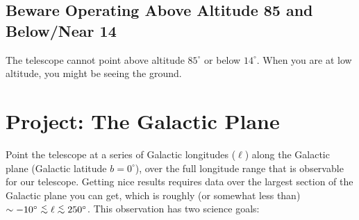 \documentclass[psfig,preprint]{aastex}
\def\simlt{\lower.5ex\hbox{$\; \buildrel < \over \sim \;$}}
\begin{document}
\subsection{Beware Operating Above Altitude 85 and Below/Near 14}

\noindent
The telescope cannot point above altitude $85^\circ$ or 
below $14^\circ$. When you are at low altitude, you might be
seeing the ground.

\section{Project: The Galactic Plane } 
\label{galacticplane}

\noindent
	Point the telescope at a series of Galactic longitudes ($\ell$)
along the Galactic plane (Galactic latitude $b = 0^\circ$), over the
full longitude range that is observable for our telescope.  Getting nice
results requires data over the largest section of the Galactic plane you
can get, which is roughly (or somewhat less than) $\sim -10^\circ \simlt
\ell \simlt 250^\circ$. This observation has two science goals:
\end{document}
